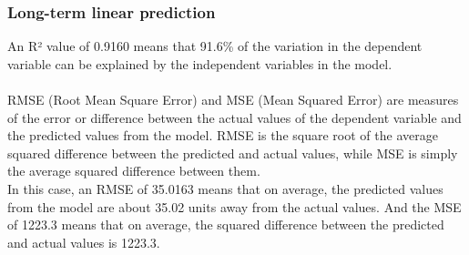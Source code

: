         \subsubsection{Long-term linear prediction} \label{subsec:res_ltlp}
        An R² value of 0.9160 means that 91.6\% of the variation in the dependent
        variable can be explained by the independent variables in the model.\\
        \\
        RMSE (Root Mean Square Error) and MSE (Mean Squared Error) are measures of the
        error or difference between the actual values of the dependent variable and the
        predicted values from the model. RMSE is the square root of the average squared
        difference between the predicted and actual values, while MSE is simply the
        average squared difference between them.\\
        \newpage
        In this case, an RMSE of 35.0163 means that on average, the predicted values from
        the model are about 35.02 units away from the actual values. And the
        MSE of 1223.3 means that on average, the squared difference between the predicted
        and actual values is 1223.3.
